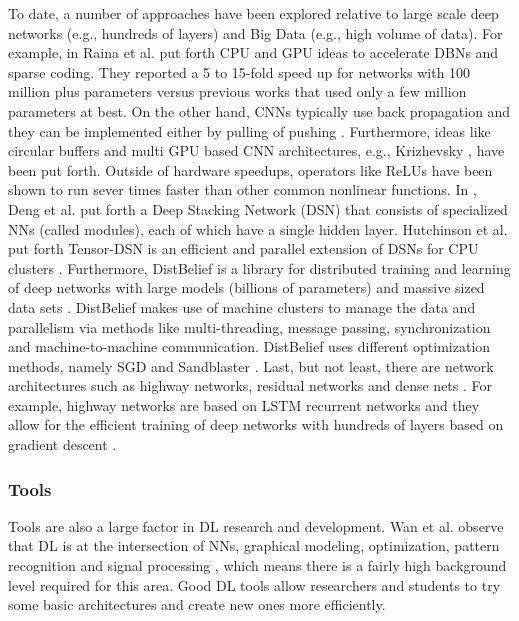 \documentclass[12pt]{spieman}
\begin{document}
\begin{spacing}{1}
To date, a number of approaches have been explored relative to large scale deep networks (e.g., hundreds of layers) and Big Data (e.g., high volume of data). For example, in \cite{Raina:2009:LDU:1553374.1553486} Raina et al. put forth CPU and GPU ideas to accelerate DBNs and sparse coding. They reported a 5 to 15-fold speed up for networks with 100 million plus parameters versus previous works that used only a few million parameters at best. On the other hand, CNNs typically use back propagation and they can be implemented either by pulling of pushing \cite{Ciresan:2011:FHP:2283516.2283603} . Furthermore, ideas like circular buffers \cite{Scherer:2010:EPO:1886436.1886447} and multi GPU based CNN architectures, e.g., Krizhevsky \cite{krizhevsky2012imagenet} , have been put forth. Outside of hardware speedups, operators like ReLUs have been shown to run sever times faster than other common nonlinear functions. In \cite{6288333} , Deng et al. put forth a Deep Stacking Network (DSN) that consists of specialized NNs (called modules), each of which have a single hidden layer. Hutchinson et al. put forth Tensor-DSN is an efficient and parallel extension of DSNs for CPU clusters \cite{Hutchinson:2013:TDS:2498740.2498878} . Furthermore, DistBelief is a library for distributed training and learning of deep networks with large models (billions of parameters) and massive sized data sets \cite{Dean:2012:LSD:2999134.2999271} . DistBelief makes use of machine clusters to manage the data and parallelism via methods like multi-threading, message passing, synchronization and machine-to-machine communication. DistBelief uses different optimization methods, namely SGD and Sandblaster \cite{dean2012large} . Last, but not least, there are network architectures such as highway networks, residual networks and dense nets  \cite{DBLP:journals/corr/HeZRS15,DBLP:journals/corr/SrivastavaGS15,DBLP:journals/corr/GreffSS16,DBLP:journals/corr/ZillySKS16,DBLP:journals/corr/SrivastavaGS15a} . For example, highway networks are based on LSTM recurrent networks and they allow for the efficient training of deep networks with hundreds of layers based on gradient descent  \cite{DBLP:journals/corr/SrivastavaGS15,DBLP:journals/corr/GreffSS16,DBLP:journals/corr/ZillySKS16} .

\subsubsection{Tools}
\label{subsubsec:Tools}
Tools are also a large factor in DL research and development. Wan et al. observe that DL is at the intersection of NNs, graphical modeling, optimization, pattern recognition and signal processing \cite{Wan2014Deep} , which means there is a fairly high background level required for this area. Good DL tools allow researchers and students to try some basic architectures and create new ones more efficiently.


\end{spacing}
\end{document}
